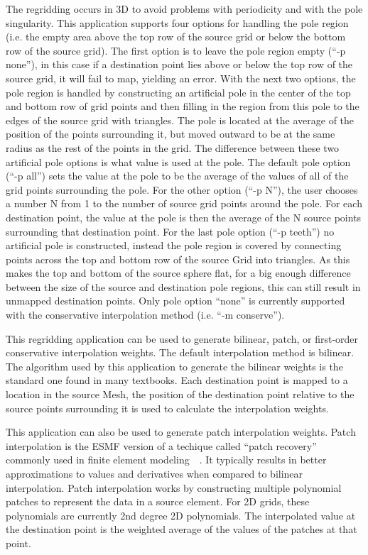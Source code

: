 The regridding occurs in 3D to avoid
problems with periodicity and with the pole singularity. This application
supports four options for handling the pole region (i.e. the empty area above the top row of the source grid or below
the bottom row of the source grid).  The first option is to leave the pole region empty (``-p none''), in this 
case if a destination point lies above or below the 
top row of the source grid, it will fail to map, yielding an error. 
With the next two options, the pole region is handled by constructing 
an artificial pole in the center of the top and bottom row of grid points and then filling
in the region from this pole to the edges of the source grid with triangles. 
The pole is located at the average of the position of the points surrounding
it, but moved outward to be at the same radius as the rest of the points
in the grid. The difference between these two artificial pole options is what value is used at the pole. 
The default pole option (``-p all'') sets the value at the pole to be the average of the values
of all of the grid points surrounding the pole. For the other option (``-p N''), the user chooses
a number N from 1 to the number of source grid points around the pole. For
each destination point, the value at the pole is then the average of the N source points
surrounding that destination point. For the last pole option (``-p teeth'') no artificial pole is constructed, instead the
pole region is covered by connecting points across the top and bottom row of the source Grid into triangles. As 
this makes the top and bottom of the source sphere flat, for a big enough difference between the size of
the source and destination pole regions, this can still result in unmapped destination points.  
Only pole option ``none'' is currently supported with the conservative interpolation method (i.e. ``-m conserve''). 

 This regridding application can be used to generate bilinear, patch, or first-order conservative interpolation weights. The default interpolation method
is bilinear. The algorithm used by this application to generate the bilinear weights is the standard one found in
many textbooks.  Each destination point is mapped to a location in the source Mesh, the position of the destination point relative 
to the source points surrounding it is used to calculate the interpolation weights. 

 This application can also be used to generate patch interpolation weights. Patch
interpolation is the ESMF version of a techique called ``patch recovery'' commonly
used in finite element modeling~\cite{PatchInterp1}~\cite{PatchInterp2}. It typically results in better approximations to values and derivatives when compared to bilinear interpolation.  
Patch interpolation works by constructing multiple polynomial patches to represent
the data in a source element. For 2D grids, these polynomials 
are currently 2nd degree 2D polynomials. The interpolated value at the destination point 
is the weighted average of the values of the patches at that point. 

